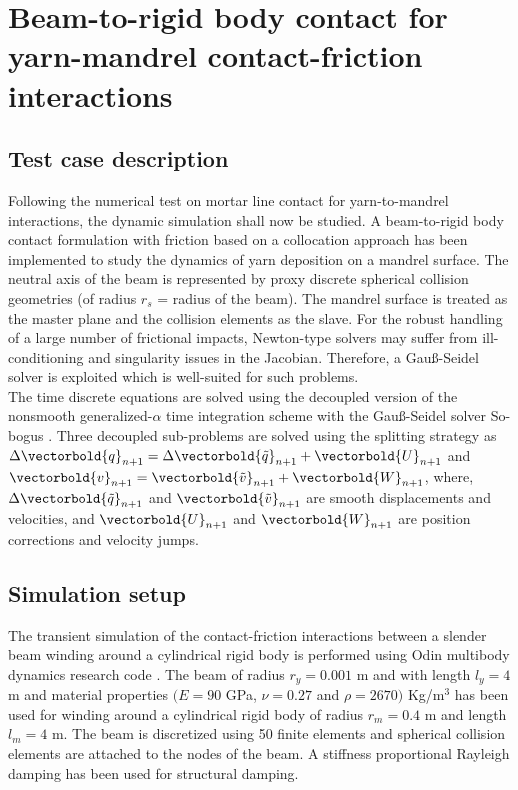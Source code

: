 \section{Beam-to-rigid body contact for yarn-mandrel contact-friction interactions}
\subsection{Test case description}
Following the numerical test on mortar line contact for yarn-to-mandrel interactions, the dynamic simulation shall now be studied. A beam-to-rigid body contact formulation with friction based on a collocation approach has been implemented to study the dynamics of yarn deposition on a mandrel surface. The neutral axis of the beam is represented by proxy discrete spherical collision geometries \cite{tasora2020geometrically} (of radius $r_s$ = radius of the beam). The mandrel surface is treated as the master plane and the collision elements as the slave. For the robust handling of a large number of frictional impacts, Newton-type solvers may suffer from ill-conditioning and singularity issues in the Jacobian. Therefore, a Gau{\ss}-Seidel solver is exploited which is well-suited for such problems.\\

The time discrete equations are solved using the decoupled version of the nonsmooth generalized-$\alpha$ time integration scheme \cite{cosimo2020robust} with the Gau{\ss}-Seidel solver So-bogus \cite{daviet2011hybrid}. Three decoupled sub-problems are solved using the splitting strategy as $\Delta \vectorbold{q}_{n+1} = \Delta \vectorbold{\Tilde{q}}_{n+1} + \vectorbold{U}_{n+1}$ and $\vectorbold{v}_{n+1} = \vectorbold{\Tilde{v}}_{n+1} + \vectorbold{W}_{n+1}$, where, $\Delta \vectorbold{\Tilde{q}}_{n+1}$ and $\vectorbold{\Tilde{v}}_{n+1}$ are smooth displacements and velocities, and $\vectorbold{U}_{n+1}$ and $\vectorbold{W}_{n+1}$ are position corrections and velocity jumps. 

\subsection{Simulation setup}
The transient simulation of the contact-friction interactions between a slender beam winding around a cylindrical rigid body is performed using Odin multibody dynamics research code \cite{odin2022}. The beam of radius $r_y = 0.001$ m and with length $l_y = 4$ m and material properties $(E = 90$ GPa, $\nu = 0.27$ and $\rho = 2670)$ Kg/m$^3$ has been used for winding around a cylindrical rigid body of radius  $r_m = 0.4$ m and length $l_m = 4$ m. The beam is discretized using 50 finite elements and spherical collision elements are attached to the nodes of the beam. A stiffness proportional Rayleigh damping has been used for structural damping. \\
 

